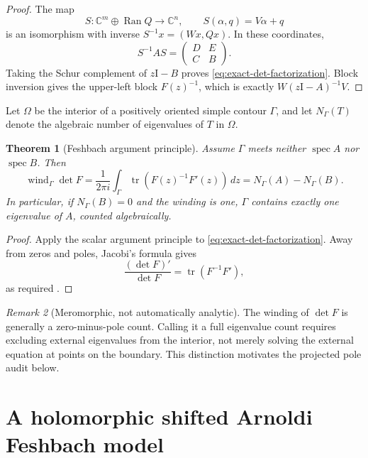 \documentclass[11pt]{article}
\newtheorem{theorem}{Theorem}[section]
\theoremstyle{definition}
\theoremstyle{remark}
\newtheorem{remark}[theorem]{Remark}
\newcommand{\C}{\mathbb C}
\newcommand{\Id}{\mathrm I}
\newcommand{\Ran}{\operatorname{Ran}}
\newcommand{\spec}{\operatorname{spec}}
\newcommand{\tr}{\operatorname{tr}}
\newcommand{\wind}{\operatorname{wind}}
\begin{document}
\begin{proof}
The map
\[
 S:\C^m\oplus\Ran Q\longrightarrow\C^n,
 \qquad S(\alpha,q)=V\alpha+q
\]
is an isomorphism with inverse $S^{-1}x=(Wx,Qx)$.  In these coordinates,
\[
 S^{-1}AS=
 \begin{pmatrix}
  D&E\\ C&B
 \end{pmatrix}.
\]
Taking the Schur complement of $z\Id-B$ proves
\cref{eq:exact-det-factorization}.  Block inversion gives the upper-left
block $F(z)^{-1}$, which is exactly
$W(z\Id-A)^{-1}V$.
\end{proof}

Let $\Omega$ be the interior of a positively oriented simple contour
$\Gamma$, and let $N_\Gamma(T)$ denote the algebraic number of eigenvalues
of $T$ in $\Omega$.

\begin{theorem}[Feshbach argument principle]
\label{thm:argument-principle}
Assume $\Gamma$ meets neither $\spec A$ nor $\spec B$.  Then
\begin{equation}
 \wind_\Gamma\det F
 =\frac{1}{2\pi i}\int_\Gamma
   \tr\!\left(F(z)^{-1}F'(z)\right)\,dz
 =N_\Gamma(A)-N_\Gamma(B).
 \label{eq:feshbach-count}
\end{equation}
In particular, if $N_\Gamma(B)=0$ and the winding is one, $\Gamma$ contains
exactly one eigenvalue of $A$, counted algebraically.
\end{theorem}

\begin{proof}
Apply the scalar argument principle to
\cref{eq:exact-det-factorization}.  Away from zeros and poles, Jacobi's
formula gives
\[
 \frac{(\det F)'}{\det F}=\tr(F^{-1}F'),
\]
as required \citep{Ahlfors1979,HornJohnson2013}.
\end{proof}

\begin{remark}[Meromorphic, not automatically analytic]
\label{rem:meromorphic}
The winding of $\det F$ is generally a zero-minus-pole count.  Calling it a
full eigenvalue count requires excluding external eigenvalues from the
interior, not merely solving the external equation at points on the
boundary.  This distinction motivates the projected pole audit below.
\end{remark}

\section{A holomorphic shifted Arnoldi Feshbach model}
\label{sec:arnoldi}
\end{document}
